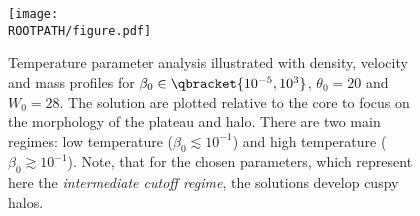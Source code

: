 \begin{figure}%
	\centering%
	\texttt{[image: \\ROOTPATH/figure.pdf]}
	\caption{Temperature parameter analysis illustrated with density, velocity and mass profiles for $\beta_0\in\qbracket{10^{-5},10^{3}}$, $\theta_0 = 20$ and $W_0 = 28$. The solution are plotted relative to the core to focus on the morphology of the plateau and halo. There are two main regimes: low temperature  ($\beta_0 \lesssim 10^{-1}$) and high temperature ($\beta_0 \gtrsim 10^{-1}$). Note, that for the chosen parameters, which represent here the \textit{intermediate cutoff regime}, the solutions develop cuspy halos.}%
	\label{fig:profile:with-cutoff:beta0-intermediate:core}%
\end{figure}